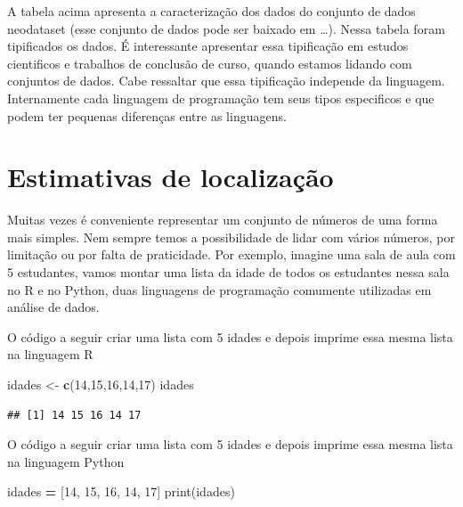 \documentclass[
]{book}
\newenvironment{Shaded}{\begin{snugshade}}{\end{snugshade}}
\newcommand{\BuiltInTok}[1]{#1}
\newcommand{\DecValTok}[1]{\textcolor[rgb]{0.00,0.00,0.81}{#1}}
\newcommand{\FunctionTok}[1]{\textcolor[rgb]{0.13,0.29,0.53}{\textbf{#1}}}
\newcommand{\NormalTok}[1]{#1}
\newcommand{\OperatorTok}[1]{\textcolor[rgb]{0.81,0.36,0.00}{\textbf{#1}}}
\newcommand{\OtherTok}[1]{\textcolor[rgb]{0.56,0.35,0.01}{#1}}
\begin{document}
A tabela acima apresenta a caracterização dos dados do conjunto de dados neodataset (esse conjunto de dados pode ser baixado em \ldots). Nessa tabela foram tipificados os dados. É interessante apresentar essa tipificação em estudos cientificos e trabalhos de conclusão de curso, quando estamos lidando com conjuntos de dados. Cabe ressaltar que essa tipificação independe da linguagem. Internamente cada linguagem de programação tem seus tipos especificos e que podem ter pequenas diferenças entre as linguagens.

\chapter{Estimativas de localização}\label{estimativas-de-localizauxe7uxe3o}

Muitas vezes é conveniente representar um conjunto de números de uma forma mais simples. Nem sempre temos a possibilidade de lidar com vários números, por limitação ou por falta de praticidade. Por exemplo, imagine uma sala de aula com 5 estudantes, vamos montar uma lista da idade de todos os estudantes nessa sala no R e no Python, duas linguagens de programação comumente utilizadas em análise de dados.

O código a seguir criar uma lista com 5 idades e depois imprime essa mesma lista na linguagem R

\begin{Shaded}
\begin{Highlighting}[]
\NormalTok{idades }\OtherTok{\textless{}{-}} \FunctionTok{c}\NormalTok{(}\DecValTok{14}\NormalTok{,}\DecValTok{15}\NormalTok{,}\DecValTok{16}\NormalTok{,}\DecValTok{14}\NormalTok{,}\DecValTok{17}\NormalTok{)}
\NormalTok{idades}
\end{Highlighting}
\end{Shaded}

\begin{verbatim}
## [1] 14 15 16 14 17
\end{verbatim}

O código a seguir criar uma lista com 5 idades e depois imprime essa mesma lista na linguagem Python

\begin{Shaded}
\begin{Highlighting}[]
\NormalTok{idades }\OperatorTok{=}\NormalTok{ [}\DecValTok{14}\NormalTok{, }\DecValTok{15}\NormalTok{, }\DecValTok{16}\NormalTok{, }\DecValTok{14}\NormalTok{, }\DecValTok{17}\NormalTok{] }
\BuiltInTok{print}\NormalTok{(idades)}
\end{Highlighting}
\end{Shaded}
\end{document}
